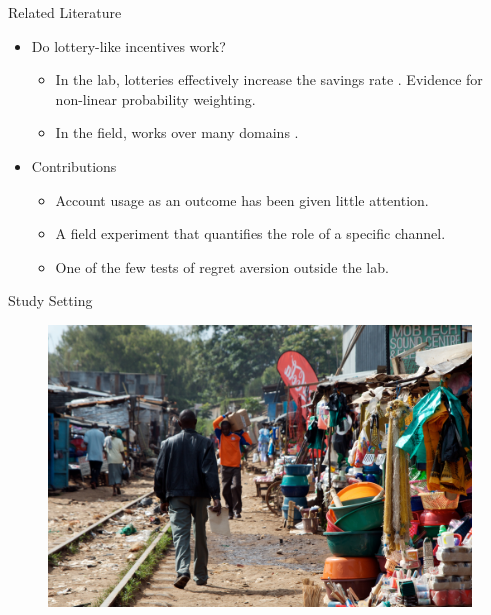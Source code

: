 \documentclass[aspectratio=169]{beamer}
\begin{document}
\begin{frame}{Related Literature}
	
	\begin{itemize}

		\item Do lottery-like incentives work? 
		
		\begin{itemize}
			\item In the lab, lotteries effectively increase the savings rate \parencite{atalay_savings_2014,filiz-ozbay_lottery_2015}. Evidence for non-linear probability weighting.
			\item In the field, works over many domains \parencite{dizon_leveraging_2016,gajic_cost-effectiveness_2011,brune_effect_2015,loibl_testing_2016,gertler_long-term_2017}.
		\end{itemize}

		\item Contributions

		\begin{itemize}
			\item Account usage as an outcome has been given little attention.
			\item A field experiment that quantifies the role of a specific channel.
			\item One of the few tests of regret aversion outside the lab.
		\end{itemize}

	\end{itemize}

\end{frame}

\begin{frame}{Study Setting}

	\begin{figure}[H]
		\centering
		\includegraphics[height=0.8\textheight]{kibera-tracks.jpg}
	\end{figure}


\end{frame}
\end{document}
